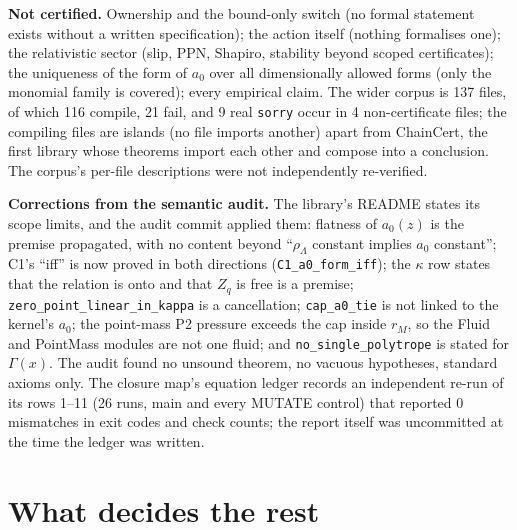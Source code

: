 \documentclass[10pt]{article}
\begin{document}
\textbf{Not certified.} Ownership and the bound-only switch (no formal statement exists without a written specification); the action itself (nothing formalises one); the relativistic sector (slip, PPN, Shapiro, stability beyond scoped certificates); the uniqueness of the form of $a_0$ over all dimensionally allowed forms (only the monomial family is covered); every empirical claim. The wider corpus is 137 files, of which 116 compile, 21 fail, and 9 real \texttt{sorry} occur in 4 non-certificate files; the compiling files are islands (no file imports another) apart from ChainCert, the first library whose theorems import each other and compose into a conclusion. The corpus's per-file descriptions were not independently re-verified.

\textbf{Corrections from the semantic audit.} The library's README states its scope limits, and the audit commit applied them: flatness of $a_0(z)$ is the premise propagated, with no content beyond ``$\rho_\Lambda$ constant implies $a_0$ constant''; C1's ``iff'' is now proved in both directions (\texttt{C1\_a0\_form\_iff}); the $\kappa$ row states that the relation is onto and that $Z_q$ is free is a premise; \texttt{zero\_point\_linear\_in\_kappa} is a cancellation; \texttt{cap\_a0\_tie} is not linked to the kernel's $a_0$; the point-mass P2 pressure exceeds the cap inside $r_M$, so the Fluid and PointMass modules are not one fluid; and \texttt{no\_single\_polytrope} is stated for $\Gamma(x)$. The audit found no unsound theorem, no vacuous hypotheses, standard axioms only. The closure map's equation ledger records an independent re-run of its rows 1--11 (26 runs, main and every MUTATE control) that reported 0 mismatches in exit codes and check counts; the report itself was uncommitted at the time the ledger was written.

\section{What decides the rest}\label{sec:decide}
\end{document}
